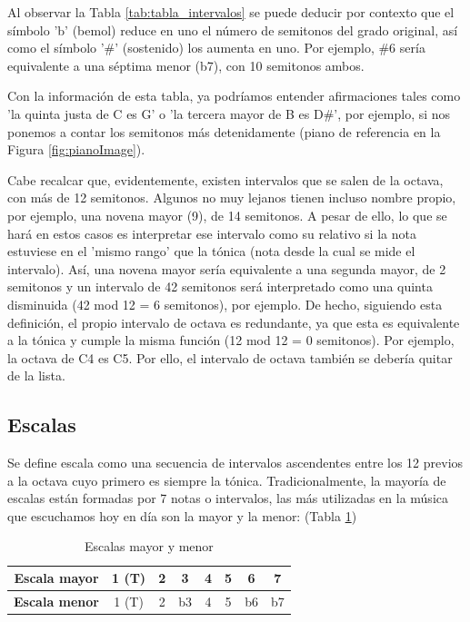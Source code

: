 Al observar la Tabla \ref{tab:tabla_intervalos} se puede deducir por contexto que el símbolo 'b' (bemol) reduce en uno el número de semitonos del grado original, así como el símbolo '\#' (sostenido) los aumenta en uno. Por ejemplo, \#6 sería equivalente a una séptima menor (b7), con 10 semitonos ambos.

Con la información de esta tabla, ya podríamos entender afirmaciones tales como 'la quinta justa de C es G' o 'la tercera mayor de B es D\#', por ejemplo, si nos ponemos a contar los semitonos más detenidamente (piano de referencia en la Figura \ref{fig:pianoImage}).

Cabe recalcar que, evidentemente, existen intervalos que se salen de la octava, con más de 12 semitonos. Algunos no muy lejanos tienen incluso nombre propio, por ejemplo, una novena mayor (9), de 14 semitonos. A pesar de ello, lo que se hará en estos casos es interpretar ese intervalo como su relativo si la nota estuviese en el 'mismo rango' que la tónica (nota desde la cual se mide el intervalo). Así, una novena mayor sería equivalente a una segunda mayor, de 2 semitonos y un intervalo de 42 semitonos será interpretado como una quinta disminuida (42 mod 12 = 6 semitonos), por ejemplo. De hecho, siguiendo esta definición, el propio intervalo de octava es redundante, ya que esta es equivalente a la tónica y cumple la misma función (12 mod 12 = 0 semitonos). Por ejemplo, la octava de C4 es C5. Por ello, el intervalo de octava también se debería quitar de la lista.

\subsection{Escalas}\label{sec:arm:escalas}

Se define escala como una secuencia de intervalos ascendentes entre los 12 previos a la octava cuyo primero es siempre la tónica. Tradicionalmente, la mayoría de escalas están formadas por 7 notas o intervalos, las más utilizadas en la música que escuchamos hoy en día son la mayor y la menor: (Tabla \ref{tab:escalas})

\begin{table}[h]
    \centering
    \begin{tabular}{c|c|c|c|c|c|c|c}
        \textbf{Escala mayor} & 1 (T) & 2 & 3 & 4 & 5 & 6 & 7 \\
        \hline
        \hline
        \textbf{Escala menor} & 1 (T) & 2 & b3 & 4 & 5 & b6 & b7 \\
    \end{tabular}
    \caption{Escalas mayor y menor}
    \label{tab:escalas}
\end{table}

